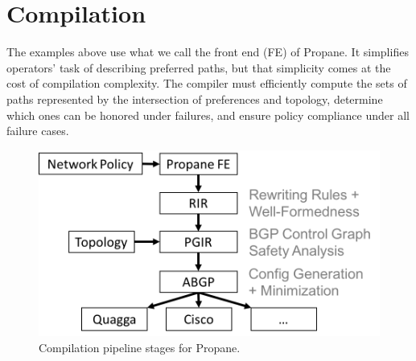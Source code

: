 \documentclass[10pt]{sigalternate052015}
\newcommand{\sysname}{{\small \sf Propane}\xspace}
\renewcommand{\path}[2]{ #1 \mapsto \ensuremath{#2} }
\begin{document}
%
%
%
%
%
%
%




%
%
%
%

\section{Compilation}
\label{sec:compilation}

The examples above use what we call the front end (FE) of \sysname.
It simplifies operators' task of describing preferred paths, but that simplicity comes at the cost of compilation complexity. The compiler must efficiently compute the sets of paths represented by the intersection of preferences and topology, determine which ones can be honored under failures, and ensure policy compliance under all failure cases.

\begin{figure}[t!]
  \centering
  \includegraphics[width=.75\columnwidth]{figures/pipeline}
  \caption{Compilation pipeline stages for Propane.}
  \label{fig:pipeline}
  \vspace{-1em}
\end{figure}
\end{document}
